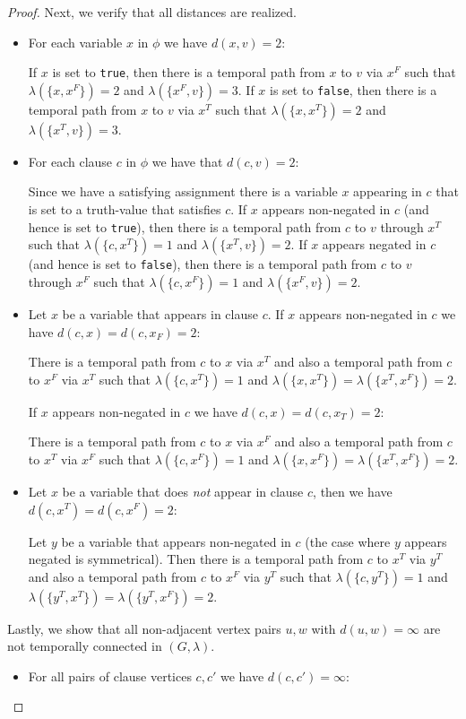 \documentclass[11pt,a4paper]{article}
\theoremstyle{remark}
\theoremstyle{definition}
\begin{document}
\begin{proof}
Next, we verify that all distances are realized.
\begin{itemize}
    \item For each variable $x$ in $\phi$ we have $d(x,v)=2$: 
    
    If $x$ is set to \texttt{true}, then there is a temporal path from $x$ to $v$ via $x^F$ such that $\lambda(\{x,x^F\})=2$ and $\lambda(\{x^F,v\})=3$. If $x$ is set to \texttt{false}, then there is a temporal path from $x$ to $v$ via $x^T$ such that $\lambda(\{x,x^T\})=2$ and $\lambda(\{x^T,v\})=3$.

    \item For each clause $c$ in $\phi$ we have that $d(c,v)=2$:

    Since we have a satisfying assignment there is a variable $x$ appearing in $c$ that is set to a truth-value that satisfies $c$. If $x$ appears non-negated in $c$ (and hence is set to \texttt{true}), then there is a temporal path from $c$ to $v$ through $x^T$ such that $\lambda(\{c,x^T\})=1$ and $\lambda(\{x^T,v\})=2$. If $x$ appears negated in $c$ (and hence is set to \texttt{false}), then there is a temporal path from $c$ to $v$ through $x^F$ such that $\lambda(\{c,x^F\})=1$ and $\lambda(\{x^F,v\})=2$.
    \item Let $x$ be a variable that appears in clause $c$.
    If $x$ appears non-negated in $c$ we have $d(c,x)=d(c,x_F)=2$:

    There is a temporal path from $c$ to $x$ via $x^T$ and also a temporal path from $c$ to $x^F$ via $x^T$ such that $\lambda(\{c,x^T\})=1$ and $\lambda(\{x,x^T\})=\lambda(\{x^T,x^F\})=2$.

    If $x$ appears non-negated in $c$ we have $d(c,x)=d(c,x_T)=2$:

    There is a temporal path from $c$ to $x$ via $x^F$ and also a temporal path from $c$ to $x^T$ via $x^F$ such that $\lambda(\{c,x^F\})=1$ and $\lambda(\{x,x^F\})=\lambda(\{x^T,x^F\})=2$.
    \item Let $x$ be a variable that does \emph{not} appear in clause $c$, then we have $d(c,x^T)=d(c,x^F)=2$:

    Let $y$ be a variable that appears non-negated in $c$ (the case where $y$ appears negated is symmetrical). Then there is a temporal path from $c$ to $x^T$ via $y^T$ and also a temporal path from $c$ to $x^F$ via $y^T$ such that $\lambda(\{c,y^T\})=1$ and $\lambda(\{y^T,x^T\})=\lambda(\{y^T,x^F\})=2$.
\end{itemize}
Lastly, we show that all non-adjacent vertex pairs $u,w$ with $d(u,w)=\infty$ are not temporally connected in $(G,\lambda)$.
\begin{itemize}
\item For all pairs of clause vertices $c,c'$ we have $d(c,c')=\infty$: 


\end{itemize}
\end{proof}
\end{document}

